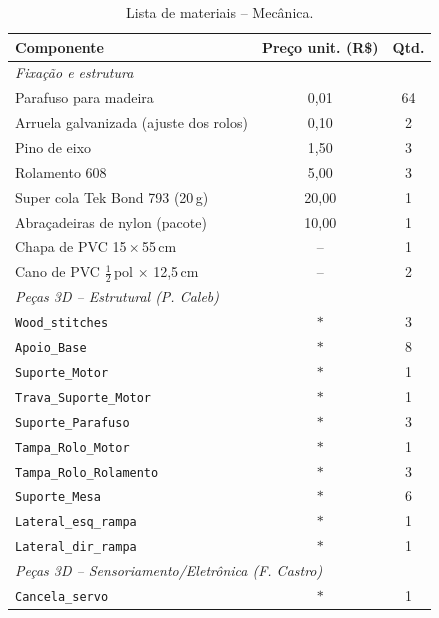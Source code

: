 \begin{table}[!htpb]
\caption{Lista de materiais -- Mecânica.}
\label{tab:BOM_mec}
\centering
\renewcommand{\arraystretch}{0.85}
\small
\begin{tabular}{lcc}
\hline
\textbf{Componente} & \textbf{Preço unit. (R\$)} & \textbf{Qtd.} \\
\hline
\multicolumn{3}{l}{\textit{Fixação e estrutura}} \\
\hline
Parafuso para madeira                              & 0,01  & 64 \\
Arruela galvanizada (ajuste dos rolos)             & 0,10  & 2  \\
Pino de eixo                                       & 1,50  & 3  \\
Rolamento 608                                      & 5,00  & 3  \\
Super cola Tek Bond 793 (20\,g)                    & 20,00 & 1  \\
Abraçadeiras de nylon (pacote)                     & 10,00 & 1  \\
Chapa de PVC 15\,$\times$\,55\,cm                 & --    & 1  \\
Cano de PVC $\frac{1}{2}$\,pol $\times$ 12,5\,cm  & --    & 2  \\
\hline
\multicolumn{3}{l}{\textit{Peças 3D -- Estrutural (P. Caleb)}} \\
\hline
\texttt{Wood\_stitches}         & $\ast$ & 3 \\
\texttt{Apoio\_Base}            & $\ast$ & 8 \\
\texttt{Suporte\_Motor}         & $\ast$ & 1 \\
\texttt{Trava\_Suporte\_Motor}  & $\ast$ & 1 \\
\texttt{Suporte\_Parafuso}      & $\ast$ & 3 \\
\texttt{Tampa\_Rolo\_Motor}     & $\ast$ & 1 \\
\texttt{Tampa\_Rolo\_Rolamento} & $\ast$ & 3 \\
\texttt{Suporte\_Mesa}          & $\ast$ & 6 \\
\texttt{Lateral\_esq\_rampa}    & $\ast$ & 1 \\
\texttt{Lateral\_dir\_rampa}    & $\ast$ & 1 \\
\hline
\multicolumn{3}{l}{\textit{Peças 3D -- Sensoriamento/Eletrônica (F. Castro)}} \\
\hline
\texttt{Cancela\_servo}               & $\ast$ & 1 \\

\end{tabular}
\end{table}
